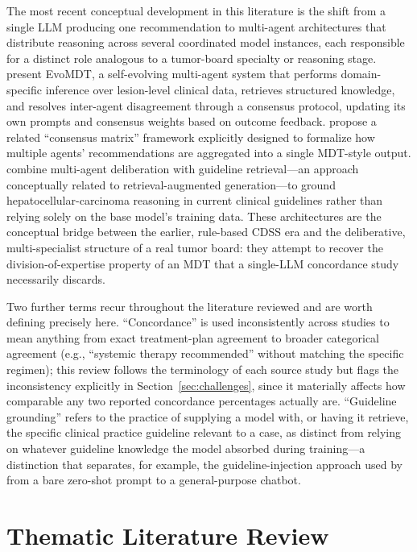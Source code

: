 \documentclass{article}
\begin{document}
The most recent conceptual development in this literature is the shift from a single LLM producing one recommendation to multi-agent architectures that distribute reasoning across several coordinated model instances, each responsible for a distinct role analogous to a tumor-board specialty or reasoning stage. \citet{liu2026} present EvoMDT, a self-evolving multi-agent system that performs domain-specific inference over lesion-level clinical data, retrieves structured knowledge, and resolves inter-agent disagreement through a consensus protocol, updating its own prompts and consensus weights based on outcome feedback. \citet{han2025} propose a related ``consensus matrix'' framework explicitly designed to formalize how multiple agents' recommendations are aggregated into a single MDT-style output. \citet{saenz2026} combine multi-agent deliberation with guideline retrieval---an approach conceptually related to retrieval-augmented generation---to ground hepatocellular-carcinoma reasoning in current clinical guidelines rather than relying solely on the base model's training data. These architectures are the conceptual bridge between the earlier, rule-based CDSS era and the deliberative, multi-specialist structure of a real tumor board: they attempt to recover the division-of-expertise property of an MDT that a single-LLM concordance study necessarily discards.

Two further terms recur throughout the literature reviewed and are worth defining precisely here. ``Concordance'' is used inconsistently across studies to mean anything from exact treatment-plan agreement to broader categorical agreement (e.g., ``systemic therapy recommended'' without matching the specific regimen); this review follows the terminology of each source study but flags the inconsistency explicitly in Section~\ref{sec:challenges}, since it materially affects how comparable any two reported concordance percentages actually are. ``Guideline grounding'' refers to the practice of supplying a model with, or having it retrieve, the specific clinical practice guideline relevant to a case, as distinct from relying on whatever guideline knowledge the model absorbed during training---a distinction that separates, for example, the guideline-injection approach used by \citet{ismayilov2025} from a bare zero-shot prompt to a general-purpose chatbot.

\section{Thematic Literature Review}
\label{sec:thematic}
\end{document}
